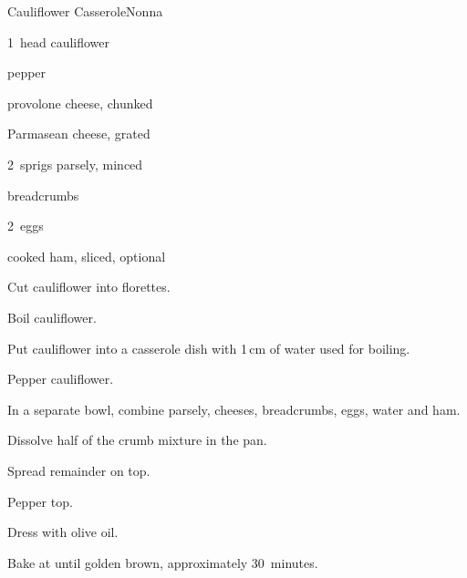 \begin{recipe}{Cauliflower Casserole}{Nonna}{}

\begin{ingredients}
\item 1~head cauliflower
\item pepper
\item \C{\half} provolone cheese, chunked
\item \C{\half} Parmasean cheese, grated
\item 2~sprigs parsely, minced
\item \C{\threequarter} breadcrumbs
\item 2~eggs
\item \C{\quarter} cooked ham, sliced, optional
\end{ingredients}

\begin{directions}
\item Cut cauliflower into florettes.
\item Boil cauliflower.
\item Put cauliflower into a casserole dish with 1\,cm of water used for boiling.
\item Pepper cauliflower.
\item In a separate bowl, combine parsely, cheeses, breadcrumbs, eggs, \C{\quarter} water and ham.
\item Dissolve half of the crumb mixture in the pan.
\item Spread remainder on top.
\item Pepper top.
\item Dress with olive oil.
\item Bake at  until golden brown, approximately 30~minutes.
\end{directions}

\end{recipe}
